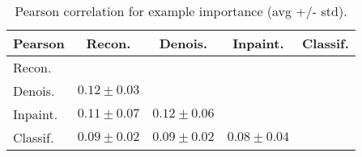 \begin{table}[]
	
	\vskip 0.05in
	\begin{center}
		\begin{adjustbox}{width=.5\columnwidth}
			\begin{small}
				\begin{sc}
                    \begin{tabular}{l|c c c c} 
						\toprule
						Pearson & Recon. & Denois. & Inpaint. & Classif. \\ 
						\hline
                        Recon. &  &  &  &  \\
                        Denois.      & $0.12 \pm 0.03$  &  &  &   \\
                        Inpaint.     & $0.11 \pm 0.07$  & $0.12 \pm 0.06$ &  &  \\
                        Classif. & $0.09 \pm 0.02$  & $0.09 \pm 0.02$ & $0.08 \pm 0.04$ &  \\
						\bottomrule
					\end{tabular}
				\end{sc}
			\end{small}	
		\end{adjustbox}
	\end{center}
        \caption{Pearson correlation for example importance (avg +/- std). %
        }
        \label{tab:pretext_examples_pearson}
\vspace{0in}
\end{table}